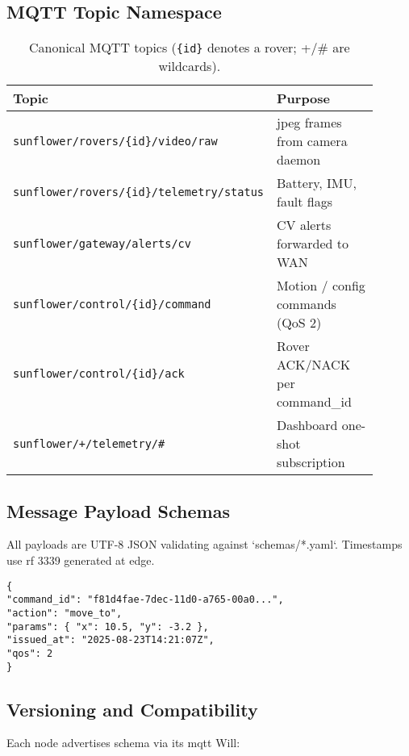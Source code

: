 \subsection{MQTT Topic Namespace}\label{subsec:mqtt-topic-namespace}

\begin{table}[ht]
\centering
\footnotesize
\caption{Canonical MQTT topics (\texttt{\{id\}} denotes a rover;
+/\# are wildcards).}
\label{tab:mqtt-topics}
\begin{tabular}{@{}p{0.55\linewidth} p{0.35\linewidth}@{}}
\toprule
\textbf{Topic} & \textbf{Purpose}\\\midrule
\texttt{sunflower/rovers/\{id\}/video/raw}        & \gls{jpeg} frames from camera daemon \\
\texttt{sunflower/rovers/\{id\}/telemetry/status} & Battery, IMU, fault flags\\
\texttt{sunflower/gateway/alerts/cv} & CV alerts forwarded to WAN\\
\texttt{sunflower/control/\{id\}/command} & Motion / config commands (QoS 2)\\
\texttt{sunflower/control/\{id\}/ack} & Rover ACK/NACK per command\_id\\
\texttt{sunflower/+/telemetry/\#} & Dashboard one-shot subscription\\
\bottomrule
\end{tabular}
\end{table}

\subsection{Message Payload Schemas}\label{subsec:message-payload-schemas}

All payloads are UTF-8 JSON validating against `schemas/*.yaml`.
Timestamps
use \gls{rf} 3339 generated at edge.

\begin{verbatim}
{
"command_id": "f81d4fae-7dec-11d0-a765-00a0...",
"action": "move_to",
"params": { "x": 10.5, "y": -3.2 },
"issued_at": "2025-08-23T14:21:07Z",
"qos": 2
}
\end{verbatim}

\subsection{Versioning and Compatibility}\label{subsec:versioning-and-compatibility}
Each node advertises schema via its \gls{mqtt} Will:

